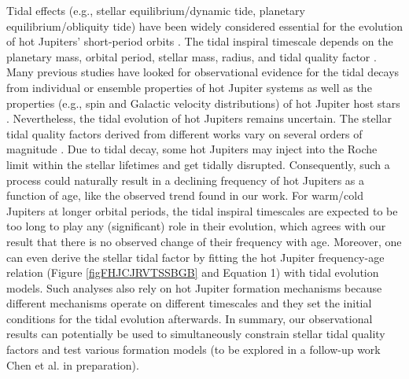 \documentclass[twocolumn]{pnas-new}
\begin{document}
{Tidal effects (e.g., stellar equilibrium/dynamic tide, planetary equilibrium/obliquity tide) have been widely considered essential for the evolution of hot Jupiters' short-period orbits \citep[see, e.g.,][]{2008ApJ...678.1396J, 2009ApJ...692L...9L,2012MNRAS.423..486L,2018ApJ...869L..15M,2018ARA&A..56..175D,2022Univ....8..211E}.
The tidal inspiral timescale depends on the planetary mass, orbital period, stellar mass, radius, and tidal quality factor \citep[see, e.g.,][]{2008ApJ...678.1396J,2012MNRAS.423..486L}}.
{Many previous studies have looked for observational evidence for the tidal decays from individual \citep[e.g., the orbital decay of hot Jupiters;][]{2009ApJ...698.1357J,2020ApJ...888L...5Y,2021AJ....161...72T,2021AJ....162..210D,2022AJ....163..281T} or ensemble properties of hot Jupiter systems \citep[e.g., the observed distributions of orbital distance/eccentricity;][]{2012ApJ...750..106S, 2015ApJ...798...66D,2017ApJ...836L..24W,2019AJ....157..217B} as well as the properties (e.g., spin and Galactic velocity distributions) of hot Jupiter host stars \citep{2019AJ....158..190H,2021ApJ...919..138T}.
Nevertheless, the tidal evolution of hot Jupiters remains uncertain. The stellar tidal quality factors derived from different works vary on several orders of magnitude \citep[e.g., $\sim 10^5$ from the tidal decay of WASP-12b and $\sim 10^{7-8}$ from the distribution of assemble properties;][]{2020ApJ...888L...5Y,2021AJ....161...72T,2017ApJ...836L..24W,2019AJ....157..217B}. Due to tidal decay, some hot Jupiters may inject into the Roche limit within the stellar lifetimes and get tidally disrupted. Consequently, such a process could naturally result in a declining frequency of hot Jupiters as a function of age, like the observed trend found in our work. For warm/cold Jupiters at longer orbital periods, the tidal inspiral timescales are expected to be too long to play any (significant) role in their evolution, which agrees with our result that there is no observed change of their frequency with age. 
Moreover, one can even derive the stellar tidal factor by fitting the hot Jupiter frequency-age relation (Figure \ref{figFHJCJRVTSSBGB} and Equation 1) with tidal evolution models. 
Such analyses also rely on hot Jupiter formation mechanisms because different mechanisms operate on different timescales and they set the initial conditions for the tidal evolution afterwards. 
In summary, our observational results can potentially be used to simultaneously constrain stellar tidal quality factors and test various formation models (to be explored in a follow-up work Chen et al. in preparation).}
\end{document}
